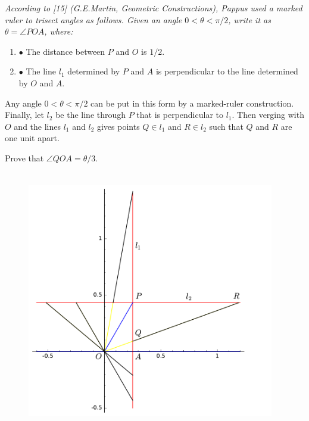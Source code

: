 \documentclass[11pt,a4paper]{article}
\newcommand{\be} {\begin{enumerate}}
\newcommand{\ee} {\end{enumerate}}
\begin{document}
{\it According to [15] (G.E.Martin, Geometric Constructions), Pappus used a marked ruler to trisect angles as follows. Given an angle $0<\theta < \pi/2$, write it as $\theta = \angle POA$, where:
\be
\item[$\bullet$] The distance between $P$ and $O$ is $1/2$.
\item[$\bullet$] The line $l_1$ determined by $P$ and $A$ is perpendicular to the line determined by $O$ and $A$.
\ee
Any angle $0 < \theta < \pi/2$ can be put in this form by a marked-ruler construction. Finally, let $l_2$ be the line through $P$ that is perpendicular to $l_1$. Then verging with $O$ and the lines $l_1$ and $l_2$ gives points $Q \in l_1$ and $R \in l_2$ such that $Q$ and $R$ are one unit apart.

Prove that $\angle QOA = \theta/3$.
}
\begin{figure}[htbp]
\begin{center}
\includegraphics[width=10.8cm,height=11.4cm]{markedRulers5.pdf}
\end{center}
\end{figure}
\end{document}
